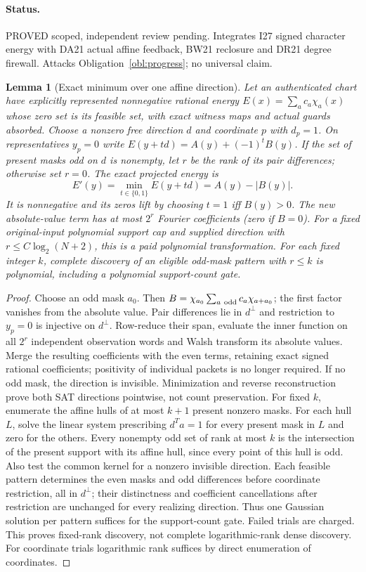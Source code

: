\documentclass[11pt]{article}
\newtheorem{lemma}[theorem]{Lemma}
\begin{document}
\paragraph{Status.} PROVED scoped, independent review pending. Integrates I27 signed character energy with DA21 actual affine feedback, BW21 reclosure and DR21 degree firewall. Attacks Obligation~\ref{obl:progress}; no universal claim.
\begin{lemma}[Exact minimum over one affine direction]\label{lem:ds21-min}
Let an authenticated chart have explicitly represented nonnegative rational energy $E(x)=\sum_a c_a\chi_a(x)$ whose zero set is its feasible set, with exact witness maps and actual guards absorbed. Choose a nonzero free direction $d$ and coordinate $p$ with $d_p=1$. On representatives $y_p=0$ write $E(y+td)=A(y)+(-1)^tB(y)$. If the set of present masks odd on $d$ is nonempty, let $r$ be the rank of its pair differences; otherwise set $r=0$. The exact projected energy is
\[
 E'(y)=\min_{t\in\{0,1\}}E(y+td)=A(y)-|B(y)|.
\]
It is nonnegative and its zeros lift by choosing $t=1$ iff $B(y)>0$. The new absolute-value term has at most $2^r$ Fourier coefficients (zero if $B=0$). For a fixed original-input polynomial support cap and supplied direction with $r\le C\log_2(N+2)$, this is a paid polynomial transformation. For each fixed integer $k$, complete discovery of an eligible odd-mask pattern with $r\le k$ is polynomial, including a polynomial support-count gate.
\end{lemma}
\begin{proof}
Choose an odd mask $a_0$. Then $B=\chi_{a_0}\sum_{a\ {\rm odd}}c_a\chi_{a+a_0}$; the first factor vanishes from the absolute value. Pair differences lie in $d^\perp$ and restriction to $y_p=0$ is injective on $d^\perp$. Row-reduce their span, evaluate the inner function on all $2^r$ independent observation words and Walsh transform its absolute values. Merge the resulting coefficients with the even terms, retaining exact signed rational coefficients; positivity of individual packets is no longer required. If no odd mask, the direction is invisible. Minimization and reverse reconstruction prove both SAT directions pointwise, not count preservation.
For fixed $k$, enumerate the affine hulls of at most $k+1$ present nonzero masks. For each hull $L$, solve the linear system prescribing $d^Ta=1$ for every present mask in $L$ and zero for the others. Every nonempty odd set of rank at most $k$ is the intersection of the present support with its affine hull, since every point of this hull is odd. Also test the common kernel for a nonzero invisible direction. Each feasible pattern determines the even masks and odd differences before coordinate restriction, all in $d^\perp$; their distinctness and coefficient cancellations after restriction are unchanged for every realizing direction. Thus one Gaussian solution per pattern suffices for the support-count gate. Failed trials are charged. This proves fixed-rank discovery, not complete logarithmic-rank dense discovery. For coordinate trials logarithmic rank suffices by direct enumeration of coordinates.
\end{proof}
\end{document}

